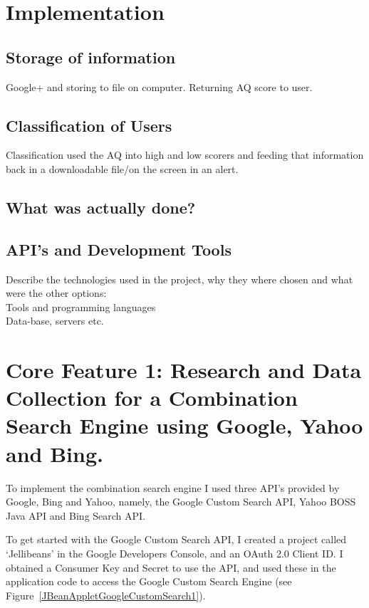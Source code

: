 \documentclass[a4paper, 11pt]{article}
\begin{document}
\section{Implementation}

\subsection{Storage of information}
Google+ and storing to file on computer.
Returning AQ score to user.


\subsection{Classification of Users}
Classification used the AQ into high and low scorers and feeding that information back in a downloadable file/on the screen in an alert.



\subsection{What was actually done?}

\subsection{API's and Development Tools}
Describe the technologies used in the project, why they where
chosen and what were the other options:\\
Tools and programming languages\\
Data-base, servers etc.


\section{Core Feature 1: Research and Data Collection for a Combination Search Engine using Google, Yahoo and Bing.}

To implement the combination search engine I used three API’s provided by Google, Bing and Yahoo, namely, the Google Custom Search API, Yahoo BOSS Java API and Bing Search API. 

To get started with the Google Custom Search API, I created a project called ‘Jellibeans’ in the Google Developers Console, and an OAuth 2.0 Client ID. I obtained a Consumer Key and Secret to use the API, and used these in the application code to access the Google Custom Search Engine (see Figure~\ref{JBeanAppletGoogleCustomSearch1}). 
\end{document}
